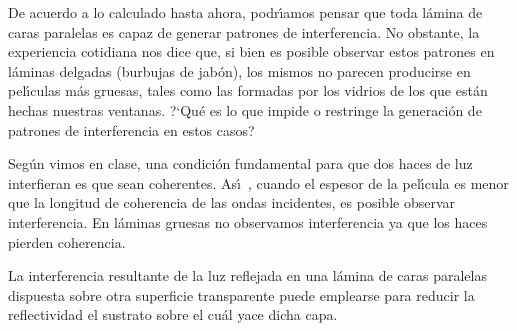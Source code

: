 \documentclass[a4paper]{article}
\begin{document}
De acuerdo a lo calculado hasta ahora, podr\'\i amos pensar que toda l\'amina
de caras paralelas es capaz de generar patrones de interferencia. No obstante,
la experiencia cotidiana nos dice que, si bien es posible observar estos 
patrones en l\'aminas delgadas (burbujas de jab\'on), los mismos no parecen
producirse en pel\'\i culas m\'as gruesas, tales como 
las formadas por los vidrios de los que est\'an hechas nuestras ventanas. 
?`Qu\'e es lo que impide o restringe la generaci\'on de patrones de 
interferencia en estos casos?

Seg\'un vimos en clase, una condici\'on fundamental para que dos haces de luz 
interfieran es que sean coherentes. As\'\i\ , cuando el espesor de la 
pel\'\i cula es menor que la longitud de coherencia de las ondas incidentes,
es posible observar interferencia. En l\'aminas gruesas no observamos 
interferencia ya que los haces pierden coherencia. 









La interferencia resultante de la luz reflejada en una l\'amina de caras
paralelas dispuesta sobre otra superficie transparente puede emplearse para
reducir la reflectividad el sustrato sobre el cu\'al yace dicha capa. 
\end{document}
